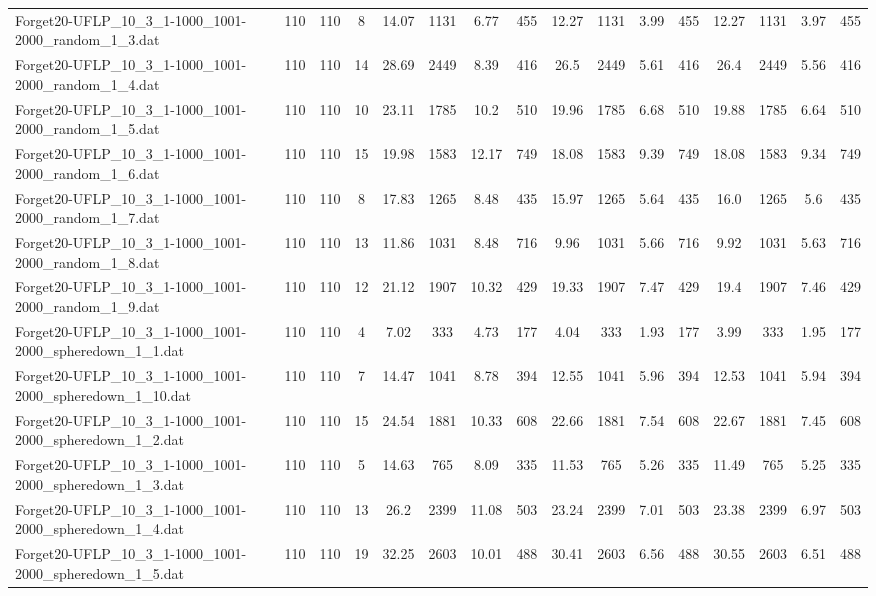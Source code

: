 \begin{sidewaystable}[!ht]
{\begin{tabular}{lccccccccccccccc}
Forget20-UFLP\_10\_3\_1-1000\_1001-2000\_random\_1\_3.dat & 110 & 110 & 8 & 14.07 & 1131 & 6.77 & 455 & 12.27 & 1131 & 3.99 & 455 & 12.27 & 1131 & 3.97 & 455 \\
Forget20-UFLP\_10\_3\_1-1000\_1001-2000\_random\_1\_4.dat & 110 & 110 & 14 & 28.69 & 2449 & 8.39 & 416 & 26.5 & 2449 & 5.61 & 416 & 26.4 & 2449 & 5.56 & 416 \\
Forget20-UFLP\_10\_3\_1-1000\_1001-2000\_random\_1\_5.dat & 110 & 110 & 10 & 23.11 & 1785 & 10.2 & 510 & 19.96 & 1785 & 6.68 & 510 & 19.88 & 1785 & 6.64 & 510 \\
Forget20-UFLP\_10\_3\_1-1000\_1001-2000\_random\_1\_6.dat & 110 & 110 & 15 & 19.98 & 1583 & 12.17 & 749 & 18.08 & 1583 & 9.39 & 749 & 18.08 & 1583 & 9.34 & 749 \\
Forget20-UFLP\_10\_3\_1-1000\_1001-2000\_random\_1\_7.dat & 110 & 110 & 8 & 17.83 & 1265 & 8.48 & 435 & 15.97 & 1265 & 5.64 & 435 & 16.0 & 1265 & 5.6 & 435 \\
Forget20-UFLP\_10\_3\_1-1000\_1001-2000\_random\_1\_8.dat & 110 & 110 & 13 & 11.86 & 1031 & 8.48 & 716 & 9.96 & 1031 & 5.66 & 716 & 9.92 & 1031 &  \textcolor{blue2}{5.63} & 716 \\
Forget20-UFLP\_10\_3\_1-1000\_1001-2000\_random\_1\_9.dat & 110 & 110 & 12 & 21.12 & 1907 & 10.32 & 429 & 19.33 & 1907 & 7.47 & 429 & 19.4 & 1907 & 7.46 & 429 \\
Forget20-UFLP\_10\_3\_1-1000\_1001-2000\_spheredown\_1\_1.dat & 110 & 110 & 4 & 7.02 & 333 & 4.73 & 177 & 4.04 & 333 & 1.93 & 177 & 3.99 & 333 & 1.95 & 177 \\
Forget20-UFLP\_10\_3\_1-1000\_1001-2000\_spheredown\_1\_10.dat & 110 & 110 & 7 & 14.47 & 1041 & 8.78 & 394 & 12.55 & 1041 & 5.96 & 394 & 12.53 & 1041 & 5.94 & 394 \\
Forget20-UFLP\_10\_3\_1-1000\_1001-2000\_spheredown\_1\_2.dat & 110 & 110 & 15 & 24.54 & 1881 & 10.33 & 608 & 22.66 & 1881 & 7.54 & 608 & 22.67 & 1881 & 7.45 & 608 \\
Forget20-UFLP\_10\_3\_1-1000\_1001-2000\_spheredown\_1\_3.dat & 110 & 110 & 5 & 14.63 & 765 & 8.09 & 335 & 11.53 & 765 & 5.26 & 335 & 11.49 & 765 & 5.25 & 335 \\
Forget20-UFLP\_10\_3\_1-1000\_1001-2000\_spheredown\_1\_4.dat & 110 & 110 & 13 & 26.2 & 2399 & 11.08 & 503 & 23.24 & 2399 & 7.01 & 503 & 23.38 & 2399 & 6.97 & 503 \\
Forget20-UFLP\_10\_3\_1-1000\_1001-2000\_spheredown\_1\_5.dat & 110 & 110 & 19 & 32.25 & 2603 & 10.01 & 488 & 30.41 & 2603 & 6.56 & 488 & 30.55 & 2603 & 6.51 & 488 \\

\end{tabular}}
\end{sidewaystable}
